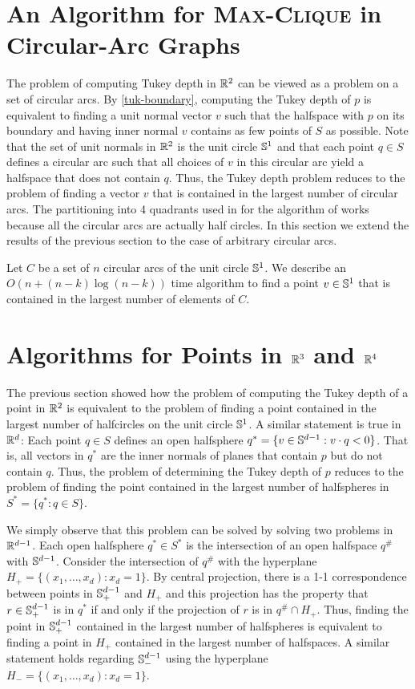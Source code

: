 \documentclass[charterfonts,lotsofwhite]{patmorin}
\begin{document}
\section{An Algorithm for \textsc{Max-Clique} in Circular-Arc Graphs}

The problem of computing Tukey depth in $\mathbb{R}^2$ can be viewed as a
problem on a set of circular arcs.  By \eqref{tuk-boundary}, computing
the Tukey depth of $p$ is equivalent to finding a unit normal vector
$v$ such that the halfspace with $p$ on its boundary and having inner
normal $v$ contains as few points of $S$ as possible.
Note that the set of unit normals in $\mathbb{R}^2$ is the unit circle $\mathbb{S}^1$
and that each point $q\in S$ defines a circular arc such that all
choices of $v$ in this circular arc yield a halfspace that does not
contain $q$.  Thus, the Tukey depth problem reduces to the problem of
finding a vector $v$ that is contained in the largest number of
circular arcs. The partitioning into 4 quadrants used in for the
algorithm of  works because all the circular arcs are
actually half circles.  In this section we extend the results of the
previous section to the case of arbitrary circular arcs.

Let $C$ be a set of $n$ circular arcs of the unit circle $\mathbb{S}^1$.  We
describe an $O(n+(n-k)\log (n-k))$ time algorithm to find a point
$v\in\mathbb{S}^1$ that is contained in the largest number of elements of
$C$.


\section{Algorithms for Points in $\mathbb{R}^3$ and $\mathbb{R}^4$}

The previous section showed how the problem of computing the Tukey
depth of a point in $\mathbb{R}^2$ is equivalent to the problem of finding a
point contained in the largest number of halfcircles on the unit
circle $\mathbb{S}^1$.  A similar statement is true in $\mathbb{R}^d$:  Each point
$q\in S$ defines an open halfsphere $q^*=\{ v\in\mathbb{S}^{d-1} : v\cdot q <
0\}$.  That is, all vectors in $q^*$ are the inner normals of planes
that contain $p$ but do not contain $q$.  Thus, the problem of
determining the Tukey depth of $p$ reduces to the problem of finding
the point contained in the largest number of halfspheres in $S^*=\{q^*
: q\in S\}$.

We simply observe that this problem can be solved by solving two
problems in $\mathbb{R}^{d-1}$.  Each open halfsphere $q^*\in S^*$ is the
intersection of an open halfspace $q^\#$ with $\mathbb{S}^{d-1}$.  Consider
the intersection of $q^\#$ with the hyperplane
$H_+=\{(x_1,\ldots,x_d):x_d=1\}$.  By central projection, there is a
1-1 correspondence between points in $\mathbb{S}^{d-1}_+$ and $H_+$ and this
projection has the property that $r\in\mathbb{S}^{d-1}_+$ is in $q^*$ if and
only if the projection of $r$ is in $q^\#\cap H_+$.  Thus, finding the
point in $\mathbb{S}^{d-1}_+$ contained in the largest number of halfspheres
is equivalent to finding a point in $H_+$ contained in the largest
number of halfspaces.  A similar statement holds regarding
$\mathbb{S}^{d-1}_-$ using the hyperplane $H_-=\{(x_1,\ldots,x_d):x_d=1\}$.
\end{document}
